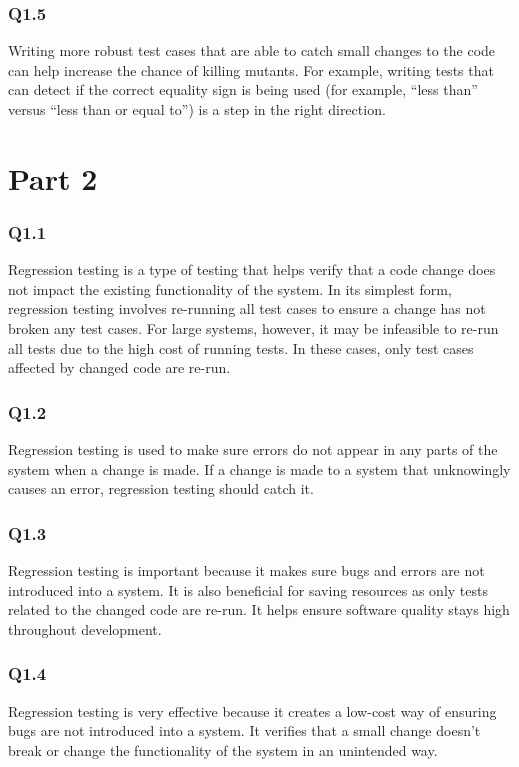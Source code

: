 \documentclass[12pt, letterpaper, titlepage]{article}
\begin{document}
\subsubsection*{Q1.5}
Writing more robust test cases that are able to catch small changes to the code can help increase the chance of killing mutants. For example, writing tests that can detect if the correct equality sign is being used (for example, ``less than'' versus ``less than or equal to'') is a step in the right direction.

\section*{Part 2}
\subsubsection*{Q1.1}
Regression testing is a type of testing that helps verify that a code change does not impact the existing functionality of the system. In its simplest form, regression testing involves re-running all test cases to ensure a change has not broken any test cases. For large systems, however, it may be infeasible to re-run all tests due to the high cost of running tests. In these cases, only test cases affected by changed code are re-run. 

\subsubsection*{Q1.2}
Regression testing is used to make sure errors do not appear in any parts of the system when a change is made. If a change is made to a system that unknowingly causes an error, regression testing should catch it.

\subsubsection*{Q1.3}
Regression testing is important because it makes sure bugs and errors are not introduced into a system. It is also beneficial for saving resources as only tests related to the changed code are re-run. It helps ensure software quality stays high throughout development.

\subsubsection*{Q1.4}
Regression testing is very effective because it creates a low-cost way of ensuring bugs are not introduced into a system. It verifies that a small change doesn't break or change the functionality of the system in an unintended way. 
\end{document}
